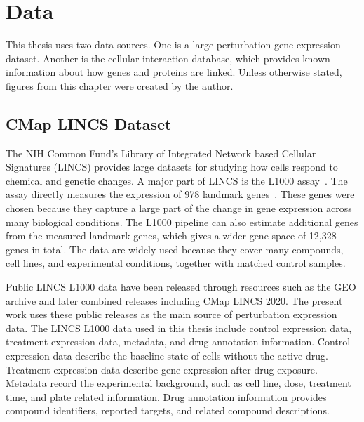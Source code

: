 \chapter{Data}

This thesis uses two data sources. One is a large perturbation gene expression dataset. Another is the cellular interaction database, which provides known information about how genes and proteins are linked. Unless otherwise stated, figures from this chapter were created by the author.

\section{CMap LINCS Dataset}
The NIH Common Fund’s Library of Integrated Network based Cellular Signatures (LINCS) provides large datasets for studying how cells respond to chemical and genetic changes. A major part of LINCS is the L1000 assay~\cite{l1000_paper}. The assay directly measures the expression of 978 landmark genes~\cite{l1000_paper}. These genes were chosen because they capture a large part of the change in gene expression across many biological conditions. The L1000 pipeline can also estimate additional genes from the measured landmark genes, which gives a wider gene space of 12,328 genes in total. The data are widely used because they cover many compounds, cell lines, and experimental conditions, together with matched control samples.

\noindent Public LINCS L1000 data have been released through resources such as the GEO archive and later combined releases including CMap LINCS 2020. The present work uses these public releases as the main source of perturbation expression data.
\noindent The LINCS L1000 data used in this thesis include control expression data, treatment expression data, metadata, and drug annotation information. Control expression data describe the baseline state of cells without the active drug. Treatment expression data describe gene expression after drug exposure. Metadata record the experimental background, such as cell line, dose, treatment time, and plate related information. Drug annotation information provides compound identifiers, reported targets, and related compound descriptions.


